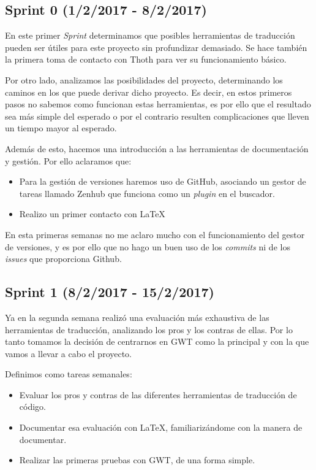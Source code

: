 \subsection{Sprint 0 (1/2/2017 - 8/2/2017)}

En este primer \emph{Sprint} determinamos que posibles herramientas de traducción pueden ser útiles para este proyecto sin profundizar demasiado. Se hace también la primera toma de contacto con Thoth para ver su funcionamiento básico.

Por otro lado, analizamos las posibilidades del proyecto, determinando los caminos en los que puede derivar dicho proyecto. Es decir, en estos primeros pasos no sabemos como funcionan estas herramientas, es por ello que el resultado sea más simple del esperado o por el contrario resulten complicaciones que lleven un tiempo mayor al esperado.

Además de esto, hacemos una introducción a las herramientas de documentación y gestión. Por ello aclaramos que:

\begin{itemize}
\item Para la gestión de versiones haremos uso de GitHub, asociando un gestor de tareas llamado Zenhub que funciona como un \emph{plugin} en el buscador.
\item Realizo un primer contacto con \LaTeX 
\end{itemize}

En esta primeras semanas no me aclaro mucho con el funcionamiento del gestor de versiones, y es por ello que no hago un buen uso de los \emph{commits} ni de los \emph{issues} que proporciona Github.

\subsection{Sprint 1 (8/2/2017 - 15/2/2017)}

Ya en la segunda semana realizó una evaluación más exhaustiva de las herramientas de traducción, analizando los pros y los contras de ellas. Por lo tanto tomamos la decisión de centrarnos en GWT como la principal y con la que vamos a llevar a cabo el proyecto.

Definimos como tareas semanales:

\begin{itemize}
\item Evaluar los pros y contras de las diferentes herramientas de traducción de código.
\item Documentar esa evaluación con \LaTeX , familiarizándome con la manera de documentar.
\item Realizar las primeras pruebas con GWT, de una forma simple.
\end{itemize}


